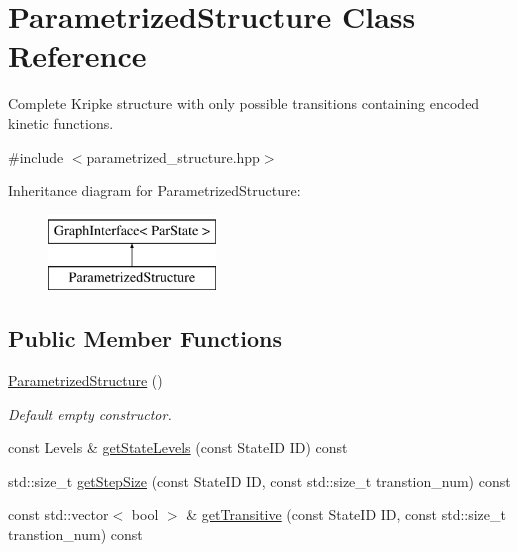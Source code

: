 \hypertarget{classParametrizedStructure}{\section{\-Parametrized\-Structure \-Class \-Reference}
\label{classParametrizedStructure}
}


\-Complete \-Kripke structure with only possible transitions containing encoded kinetic functions.  




{\ttfamily \#include $<$parametrized\-\_\-structure.\-hpp$>$}

\-Inheritance diagram for \-Parametrized\-Structure\-:\begin{figure}[H]
\begin{center}
\leavevmode
\includegraphics[height=2.000000cm]{classParametrizedStructure}
\end{center}
\end{figure}
\subsection*{\-Public \-Member \-Functions}
\begin{DoxyCompactItemize}
\item 
\hypertarget{classParametrizedStructure_a8a8fb71f58cd7ec02a05226cef4cc08b}{\hyperlink{classParametrizedStructure_a8a8fb71f58cd7ec02a05226cef4cc08b}{\-Parametrized\-Structure} ()}\label{classParametrizedStructure_a8a8fb71f58cd7ec02a05226cef4cc08b}

\begin{DoxyCompactList}\small\item\em \-Default empty constructor. \end{DoxyCompactList}\item 
const \-Levels \& \hyperlink{classParametrizedStructure_ab344a7d530e957c2ef93325863ce23a9}{get\-State\-Levels} (const \-State\-I\-D \-I\-D) const 
\item 
std\-::size\-\_\-t \hyperlink{classParametrizedStructure_aa66eea7ec82aadcb03af9c2ea9f2f289}{get\-Step\-Size} (const \-State\-I\-D \-I\-D, const std\-::size\-\_\-t transtion\-\_\-num) const 
\item 
const std\-::vector$<$ bool $>$ \& \hyperlink{classParametrizedStructure_aea25bb7c6e52090936ba18b45a169f24}{get\-Transitive} (const \-State\-I\-D \-I\-D, const std\-::size\-\_\-t transtion\-\_\-num) const 
\end{DoxyCompactItemize}
